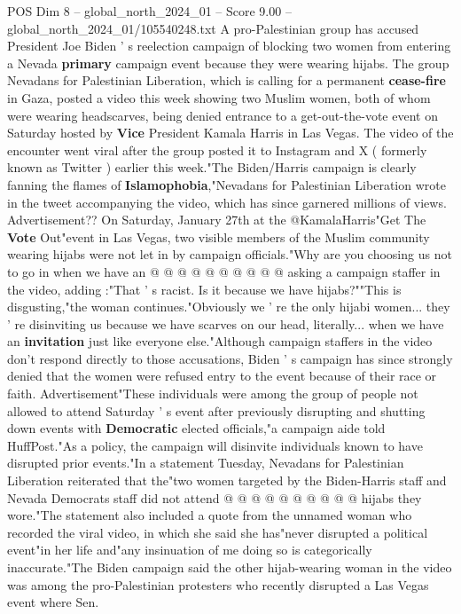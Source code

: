 \begin{textsample}{POS Dim 8 – global\_north\_2024\_01 – Score 9.00 – global\_north\_2024\_01/105540248.txt}  \label{ex:f8_pos_180}
A pro-Palestinian group has accused President Joe Biden ' s reelection campaign of blocking two women from entering a Nevada \textbf{primary} campaign event because they were wearing hijabs.
The group Nevadans for Palestinian Liberation, which is calling for a permanent \textbf{cease-fire} in Gaza, posted a video this week showing two Muslim women, both of whom were wearing headscarves, being denied entrance to a get-out-the-vote event on Saturday hosted by \textbf{Vice} President Kamala Harris in Las Vegas.
The video of the encounter went viral after the group posted it to Instagram and X ( formerly known as Twitter ) earlier this week."The Biden/Harris campaign is clearly fanning the flames of \textbf{Islamophobia},"Nevadans for Palestinian Liberation wrote in the tweet accompanying the video, which has since garnered millions of views.
Advertisement??
On Saturday, January 27th at the @KamalaHarris"Get The \textbf{Vote} Out"event in Las Vegas, two visible members of the Muslim community wearing hijabs were not let in by campaign officials."Why are you choosing us not to go in when we have an @ @ @ @ @ @ @ @ @ @ asking a campaign staffer in the video, adding :"That ' s racist.
Is it because we have hijabs?""This is disgusting,"the woman continues."Obviously we ' re the only hijabi women... they ' re disinviting us because we have scarves on our head, literally... when we have an \textbf{invitation} just like everyone else."Although campaign staffers in the video don't respond directly to those accusations, Biden ' s campaign has since strongly denied that the women were refused entry to the event because of their race or faith.
Advertisement"These individuals were among the group of people not allowed to attend Saturday ' s event after previously disrupting and shutting down events with \textbf{Democratic} elected officials,"a campaign aide told HuffPost."As a policy, the campaign will disinvite individuals known to have disrupted prior events."In a statement Tuesday, Nevadans for Palestinian Liberation reiterated that the"two women targeted by the Biden-Harris staff and Nevada Democrats staff did not attend @ @ @ @ @ @ @ @ @ @ hijabs they wore."The statement also included a quote from the unnamed woman who recorded the viral video, in which she said she has"never disrupted a political event"in her life and"any insinuation of me doing so is categorically inaccurate."The Biden campaign said the other hijab-wearing woman in the video was among the pro-Palestinian protesters who recently disrupted a Las Vegas event where Sen.

\end{textsample}
